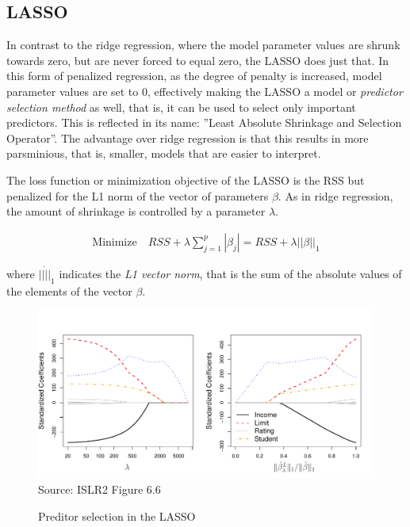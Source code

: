 \subsection{LASSO}

In contrast to the ridge regression, where the model parameter values are shrunk towards zero, but are never forced to equal zero, the LASSO does just that. In this form of penalized regression, as the degree of penalty is increased, model parameter values are set to 0, effectively making the LASSO a model or \emph{predictor selection method} as well, that is, it can be used to select only important predictors. This is reflected in its name: ''Least Absolute Shrinkage and Selection Operator''. The advantage over ridge regression is that this results in more parsminious, that is, smaller, models that are easier to interpret.

The loss function or minimization objective of the LASSO is the RSS but penalized for the L1 norm of the vector of parameters $\beta$. As in ridge regression, the amount of shrinkage is controlled by a parameter $\lambda$.

\begin{align*}
\text{Minimize} \quad RSS + \lambda \sum_{j=1}^p |\beta_j| = RSS + \lambda ||\beta||_1
\end{align*}

\noindent where $||\dot||_1$ indicates the \emph{L1 vector norm}, that is the sum of the absolute values of the elements of the vector $\beta$.

\begin{figure}
\centering
\includegraphics[width=.85\textwidth]{../class11/Figures_Chapters_1-6/Chapter6/6_6.pdf} \\

\scriptsize Source: ISLR2 Figure 6.6
\caption{Preditor selection in the LASSO}
\label{fig:lasso1}
\end{figure}

